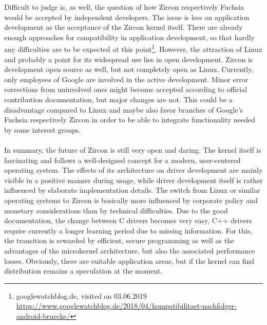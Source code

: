 Difficult to judge is, as well, the question of how Zircon respectively Fuchsia would be accepted by independent developers.
The issue is less on application development as the acceptance of the Zircon kernel itself.
There are already enough approaches for compatibility in application development, so that hardly any difficulties are to be expected at this point\footnote{googlewatchblog.de, visited on 03.06.2019 \url{https://www.googlewatchblog.de/2018/04/kompatibilitaet-nachfolger-android-bruecke/}}.
However, the attraction of Linux and probably a point for its widespread use lies in open development.
Zircon is development open source as well, but not completely open as Linux.
Currently, only employees of Google are involved in the active development.
Minor error corrections from uninvolved ones might become accepted according to official contribution documentation, but major changes are not.
This could be a disadvantage compared to Linux and maybe also favor branches of Google's Fuchsia respectively Zircon in order to be able to integrate functionality needed by some interest groups.
\\
\\
In summary, the future of Zircon is still very open and daring.
The kernel itself is fascinating and follows a well-designed concept for a modern, user-centered operating system.
The effects of its architecture on driver development are mainly visible in a positive manner during usage, while driver development itself is rather influenced by  elaborate implementation details.
The switch from Linux or similar operating systems to Zircon is basically more influenced by corporate policy and monetary considerations than by technical difficulties.
Due to the good documentation, the change between C drivers becomes very easy, C++ drivers require currently a longer learning period due to missing information.
For this, the transition is rewarded by efficient, secure programming as well as the advantages of the microkernel architecture, but also the associated performance losses.
Obviously, there are suitable application areas, but if the kernel can find distribution remains a speculation at the moment.
